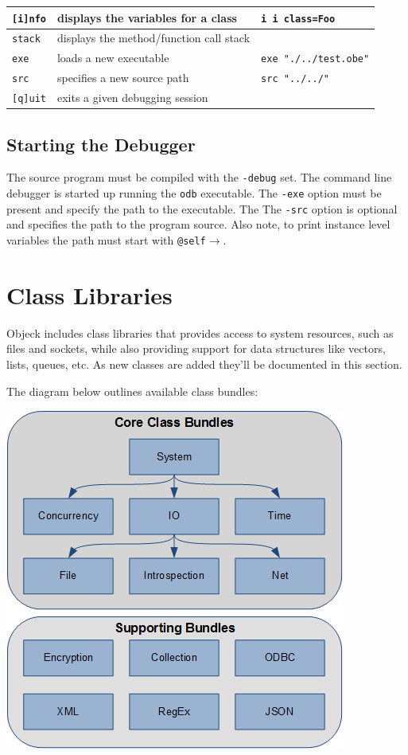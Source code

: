 \documentclass[11pt]{article}
\begin{document}
\begin{center}
\begin{tabular}{| l |p{4 cm} |p{4 cm} |}
    \texttt{[i]nfo} &  displays the variables for a class & \texttt{i
      \newline i class=Foo} \\ \hline
    \texttt{stack} &  displays the method/function call stack &  \\ \hline
    \texttt{exe} &  loads a new executable & \texttt{exe "./../test.obe"} \\ \hline
    \texttt{src} &  specifies a new source path & \texttt{src "../../"} \\ \hline
    \texttt{[q]uit} &  exits a given debugging session &  \\ \hline
  \end{tabular}
\end{center}

\subsection{Starting the Debugger}
The source program must be compiled with the \texttt{-debug} set. The
command line debugger is started up running the \texttt{odb}
executable. The \texttt{-exe} option must be present and specify the
path to the executable.  The The \texttt{-src} option is optional and
specifies the path to the program source.  Also note, to print
instance level variables the path must start with
\texttt{@self$\rightarrow$}.

\section{Class Libraries}
Objeck includes class libraries that provides access to system
resources, such as files and sockets, while also providing support for
data structures like vectors, lists, queues, etc.  As new classes are
added they'll be documented in this section.

The diagram below outlines available class bundles:

\begin{center}
  \includegraphics{../../images/classes.png}
\end{center}
\end{document}
